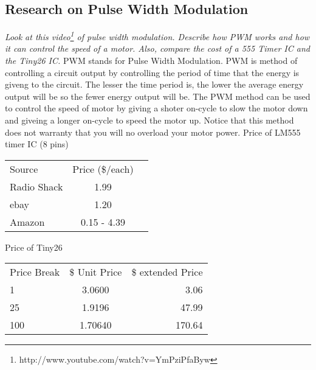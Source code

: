 \documentclass{article}
\begin{document}
\subsection{Research on Pulse Width Modulation}
\emph{Look at this video\footnote{http://www.youtube.com/watch?v=YmPziPfaByw} of pulse width modulation. Describe how PWM works and how it can control the speed of a motor. Also, compare the cost of a 555 Timer IC and the Tiny26 IC.}\newline \newline 
\indent PWM stands for Pulse Width Modulation.  PWM is method of controlling a circuit output by controlling the period of time that the energy is giveng to the circuit. The lesser the time period is, the lower the average energy output will be so the fewer energy output will be.  The PWM method can be used to control the speed of motor by giving a shoter on-cycle to slow the motor down and giveing a longer on-cycle to speed the motor up.  Notice that this method does not warranty that you will no overload your motor power.\newline\newline
\indent Price of LM555 timer IC (8 pins)\newline
\begin {center}

\begin{tabular}{l c r}
Source & Price (\$/each)\\
Radio Shack & 1.99\\
ebay &  1.20\\
Amazon & 0.15 - 4.39\\
\end{tabular}
\newline
\end {center}

Price of Tiny26\newline
\begin {center}
\begin{tabular}{l c r}
Price Break & \$ Unit Price & \$ extended Price\\

1 & 3.0600 &3.06 \\
25&1.9196&47.99\\
100&1.70640&170.64\\

\end{tabular}
\end {center}
\end{document}
